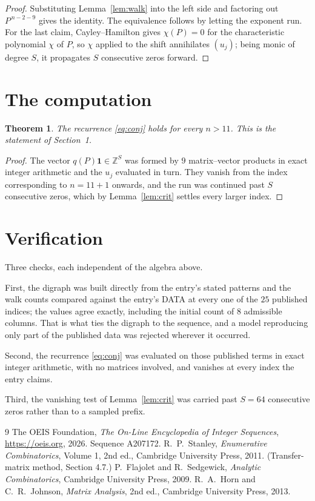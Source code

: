 \documentclass[11pt,a4paper]{article}
\theoremstyle{plain}
\newtheorem{theorem}{Theorem}
\theoremstyle{definition}
\begin{document}
\begin{proof}
Substituting Lemma~\ref{lem:walk} into the left side and factoring out
$P^{\,n-2-9}$ gives the identity. The equivalence follows by letting the exponent
run. For the last claim, Cayley--Hamilton gives $\chi(P)=0$ for the characteristic
polynomial $\chi$ of $P$, so $\chi$ applied to the shift annihilates $(u_j)$; being monic of
degree $S$, it propagates $S$ consecutive zeros forward.
\end{proof}

\section{The computation}

\begin{theorem}
The recurrence \eqref{eq:conj} holds for every $n>11$. This is the statement of
Section~1.
\end{theorem}

\begin{proof}
The vector $q(P)\mathbf{1}\in\mathbb{Z}^{S}$ was formed by $9$ matrix--vector
products in exact integer arithmetic and the $u_j$ evaluated in turn. They vanish from the
index corresponding to $n=11+1$ onwards, and the run was continued past $S$ consecutive
zeros, which by Lemma~\ref{lem:crit} settles every larger index.
\end{proof}

\section{Verification}

Three checks, each independent of the algebra above.

First, the digraph was built directly from the entry's stated patterns and the walk counts
compared against the entry's DATA at every one of the $25$ published indices; the
values agree exactly, including the initial count of $8$ admissible columns. That is
what ties the digraph to the sequence, and a model reproducing only part of the published
data was rejected wherever it occurred.

Second, the recurrence \eqref{eq:conj} was evaluated on those published terms in exact
integer arithmetic, with no matrices involved, and vanishes at every index the entry claims.

Third, the vanishing test of Lemma~\ref{lem:crit} was carried past $S=64$ consecutive
zeros rather than to a sampled prefix.

\begin{thebibliography}{9}
 The OEIS Foundation, \emph{The On-Line Encyclopedia of Integer
Sequences}, \url{https://oeis.org}, 2026. Sequence A207172.
 R.~P.~Stanley, \emph{Enumerative Combinatorics}, Volume 1, 2nd ed.,
Cambridge University Press, 2011. (Transfer-matrix method, Section 4.7.)
 P.~Flajolet and R.~Sedgewick, \emph{Analytic Combinatorics}, Cambridge
University Press, 2009.
 R.~A.~Horn and C.~R.~Johnson, \emph{Matrix Analysis}, 2nd ed., Cambridge
University Press, 2013.
\end{thebibliography}
\end{document}
